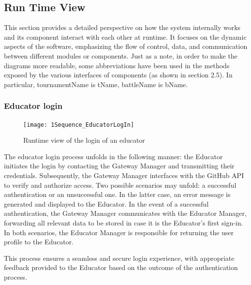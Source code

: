 \subsection{Run Time View}

This section provides a detailed perspective on how the system internally works and its component interact with each other at runtime. It focuses on the dynamic aspects of the software, emphasizing the flow of control, data, and communication between different modules or components.\newline
Just as a note, in order to make the diagrams more readable, some abbreviations have been used in the methods exposed by the various interfaces of \app components (as shown in section 2.5). In particular, tournamentName is tName, battleName is bName.


\subsubsection*{Educator login}
\begin{figure}[h!]
    \centering
    \texttt{[image: 1Sequence\_EducatorLogIn]}
    \caption{Runtime view of the login of an educator}
    \label{fig:educator_login}
\end{figure}

The educator login process unfolds in the following manner: the Educator initiates the login by contacting the Gateway Manager and transmitting their credentials. Subsequently, the Gateway Manager interfaces with the GitHub API to verify and authorize access. Two possible scenarios may unfold: a successful authentication or an unsuccessful one. In the latter case, an error message is generated and displayed to the Educator. In the event of a successful authentication, the Gateway Manager communicates with the Educator Manager, forwarding all relevant data to be stored in case it is the Educator's first sign-in. In both scenarios, the Educator Manager is responsible for returning the user profile to the Educator.

This process ensures a seamless and secure login experience, with appropriate feedback provided to the Educator based on the outcome of the authentication process.
\newpage


